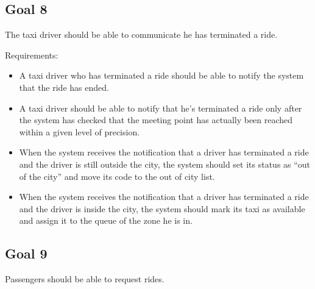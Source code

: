 \subsection{Goal 8}
The taxi driver should be able to communicate he has terminated a ride.

Requirements:
\begin{itemize}
\item A taxi driver who has terminated a ride should be able to notify the system that the ride has ended.
\item A taxi driver should be able to notify that he's terminated a ride only after the system has checked that the meeting point has actually been reached within a given level of precision.
\item When the system receives the notification that a driver has terminated a ride and the driver is still outside the city, the system should set its status as ``out of the city'' and move its code to the out of city list.
\item When the system receives the notification that a driver has terminated a ride and the driver is inside the city, the system should mark its taxi as available and assign it to the queue of the zone he is in.
\end{itemize}


\subsection{Goal 9}
Passengers should be able to request rides.

